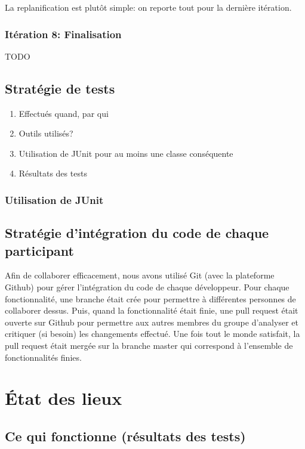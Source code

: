 \documentclass[a4paper,12pt]{article}
\begin{document}
	La replanification est plutôt simple: on reporte tout pour la dernière itération.
	
	\subsubsection{Itération 8: Finalisation}
	TODO
	
	
	\subsection{Stratégie de tests}
	\begin{enumerate}
		\item Effectués quand, par qui
		\item Outils utilisés?
		\item Utilisation de JUnit pour au moins une classe conséquente
		\item Résultats des tests
	\end{enumerate}

	\subsubsection{Utilisation de JUnit}
	
	

	\subsection{Stratégie d'intégration du code de chaque participant}
	Afin de collaborer efficacement, nous avons utilisé Git (avec la plateforme Github) pour gérer l'intégration du code de chaque développeur. Pour chaque fonctionnalité, une branche était crée pour permettre à différentes personnes de collaborer dessus. Puis, quand la fonctionnalité était finie, une pull request était ouverte sur Github pour permettre aux autres membres du groupe d'analyser et critiquer (si besoin) les changements effectué. Une fois tout le monde satisfait, la pull request était mergée sur la branche master qui correspond à l'ensemble de fonctionnalités finies.

	\section{État des lieux}
	
	
	\subsection{Ce qui fonctionne (résultats des tests)}
	
\end{document}
